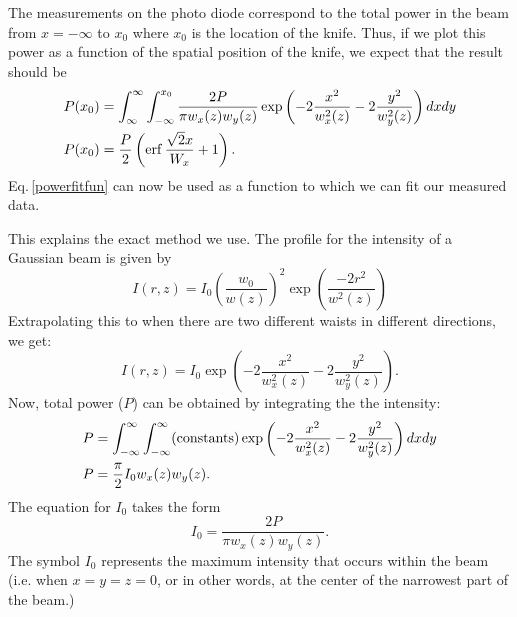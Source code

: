 The measurements on the photo diode correspond to the total power in the beam from $x=-\infty$ to $x_0$ where $x_0$ is the location of the knife. Thus, if we plot this power as a function of the spatial position of the knife, we expect that the result should be 
\begin{align}
P(x_0)&=\int_{\infty}^{\infty}\int_{-\infty}^{x_0} \frac{2 P}{\pi w_x(z) w_y(z)}\exp \left(-2\frac{x^2}{w_x^2(z)}-2\frac{y^2}{w_y^2(z)}\right) dx dy\\
P(x_0)&=\frac{P}{2} \left(\operatorname{erf} \frac{\sqrt{2} x}{W_x}+1 \right).\label{powerfitfun}
\end{align}
Eq.\,\ref{powerfitfun} can now be used as a function to which we can fit our measured data. 

This explains the exact method we use. The profile for the intensity of a Gaussian beam is given by
\begin{equation} \label{electricFieldExplicitForm}
I(r,z)=I_0\left(\frac{w_0}{w(z)}\right)^2 \exp \left(\frac{-2 r^2}{w^2(z)}\right)
\end{equation}
Extrapolating this to when there are two different waists in different directions, we get: 
\begin{equation}
I(r,z)= I_0\exp \left(-2\frac{x^2}{w_x^2(z)}-2\frac{y^2}{w_y^2(z)}\right) . 
\end{equation}
Now, total power ($P$) can be obtained by integrating the the intensity: 
\begin{align}
P&=\int_{-\infty}^{\infty}\int_{-\infty}^{\infty} ({\rm constants}) \exp \left(-2\frac{x^2}{w_x^2(z)}-2\frac{y^2}{w_y^2(z)}\right) dx dy\\
P&=\frac{\pi}{2} I_0 w_x(z) w_y(z).
\end{align}
The equation for $I_0$ takes the form
\begin{equation}
I_0=\frac{2 P}{\pi w_x(z) w_y(z)}.
\end{equation}
The symbol $I_0$ represents the maximum intensity that occurs within the beam (i.e. when $x=y=z=0$, or in other words, at the center of the narrowest part of the beam.)


